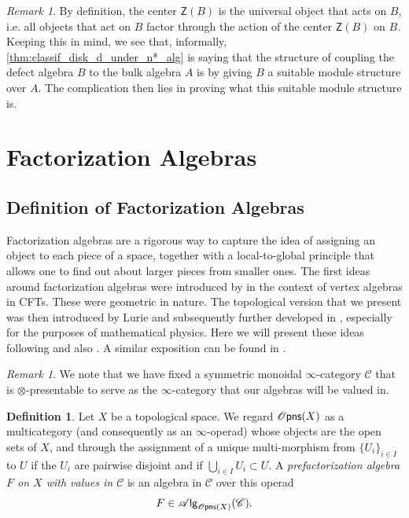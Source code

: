 \documentclass[12pt,a4paper]{article}
\newcounter{counter} \numberwithin{counter}{section}
\theoremstyle{definition}
\newtheorem{definition}[counter]{Definition}
\theoremstyle{plain}
\theoremstyle{remark}
\newtheorem{remark}[counter]{Remark}
\newcommand{\catC}{\mathscr{C}}
\newcommand{\opens}[1][s]{%
    \ifx r#1\mathsf{Opns}\else
    \ifx s#1\mathscr{O} \mathsf{pns}\else
    \mathrm{Illegal~option}%
    \fi\fi
}
\newcommand{\alg}[1]{\mathscr{A} \mathsf{lg}_{#1}}
\begin{document}
\begin{remark}
    By definition, the center $\mathsf{Z}(B)$ is the universal object that acts on $B$, i.e. all objects that act on $B$ factor through the action of the center $\mathsf{Z}(B)$ on $B$. Keeping this in mind, we see that, informally, \cref{thm:classif_disk_d_under_n*_alg} is saying that the structure of coupling the defect algebra $B$ to the bulk algebra $A$ is by giving $B$ a suitable module structure over $A$. The complication then lies in proving what this suitable module structure is. 
\end{remark}
















\section{Factorization Algebras}\label{ch:fact_alg}

\subsection{Definition of Factorization Algebras}

Factorization algebras are a rigorous way to capture the idea of assigning an object to each piece of a space, together with a local-to-global principle that allows one to find out about larger pieces from smaller ones. The first ideas around factorization algebras were introduced by \cite{bd2004} in the context of vertex algebras in CFTs. These were geometric in nature. The topological version that we present was then introduced by Lurie and subsequently further developed in \cite{cg2016}, especially for the purposes of mathematical physics. Here we will present these ideas following \cite{cg2016} and also \cite{af_primer}. A similar exposition can be found in \cite{ginot2015}.

\begin{remark}
    We note that we have fixed a symmetric monoidal $\infty$-category $\catC$ that is $\otimes$-presentable to serve as the $\infty$-category that our algebras will be valued in.
\end{remark}

\begin{definition}
    Let $X$ be a topological space. We regard $\opens[s](X)$ as a multicategory (and consequently as an $\infty$-operad) whose objects are the open sets of $X$, and through the assignment of a unique multi-morphism from $\{U_i\}_{i \in I}$ to $U$ if the $U_i$ are pairwise disjoint and if $\bigcup_{i \in I} U_i \subset U$. A \emph{prefactorization algebra $F$ on $X$ with values in $\catC$} is an algebra in $\catC$ over this operad
    \begin{align}
        F \in \alg{\opens[s](X)}(\catC).
    \end{align}
\end{definition}
\end{document}
